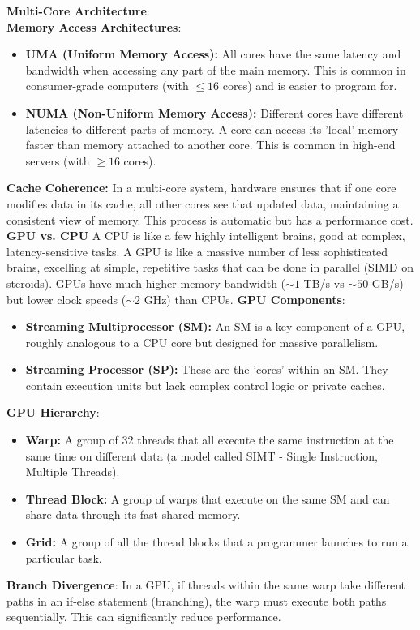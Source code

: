 \documentclass[10pt, a4paper]{article}
\begin{document}
\begin{multicols}{3}
\textbf{Multi-Core Architecture}: \\
\textbf{Memory Access Architectures}:
\begin{itemize}[nosep] %
    \item \textbf{UMA (Uniform Memory Access):} All cores have the same latency and bandwidth when accessing any part of the main memory. This is common in consumer-grade computers (with $\le 16$ cores) and is easier to program for.
    \item \textbf{NUMA (Non-Uniform Memory Access):} Different cores have different latencies to different parts of memory. A core can access its 'local' memory faster than memory attached to another core. This is common in high-end servers (with $\ge 16$ cores).
\end{itemize}
\columnbreak %
\textbf{Cache Coherence:}
In a multi-core system, hardware ensures that if one core modifies data in its cache, all other cores see that updated data, maintaining a consistent view of memory. This process is automatic but has a performance cost.
\textbf{GPU vs. CPU}
A CPU is like a few highly intelligent brains, good at complex, latency-sensitive tasks. A GPU is like a massive number of less sophisticated brains, excelling at simple, repetitive tasks that can be done in parallel (SIMD on steroids). GPUs have much higher memory bandwidth ($\sim 1$ TB/s vs $\sim 50$ GB/s) but lower clock speeds ($\sim 2$ GHz) than CPUs.
\textbf{GPU Components}:
\begin{itemize}
    \item \textbf{Streaming Multiprocessor (SM):} An SM is a key component of a GPU, roughly analogous to a CPU core but designed for massive parallelism.
    \item \textbf{Streaming Processor (SP):} These are the 'cores' within an SM. They contain execution units but lack complex control logic or private caches.
\end{itemize}
\textbf{GPU Hierarchy}:
\begin{itemize}
    \item \textbf{Warp:} A group of 32 threads that all execute the same instruction at the same time on different data (a model called SIMT - Single Instruction, Multiple Threads).
    \item \textbf{Thread Block:} A group of warps that execute on the same SM and can share data through its fast shared memory.
    \item \textbf{Grid:} A group of all the thread blocks that a programmer launches to run a particular task.
\end{itemize}
\textbf{Branch Divergence}:
In a GPU, if threads within the same warp take different paths in an if-else statement (branching), the warp must execute both paths sequentially. This can significantly reduce performance.



\end{multicols}
\end{document}
